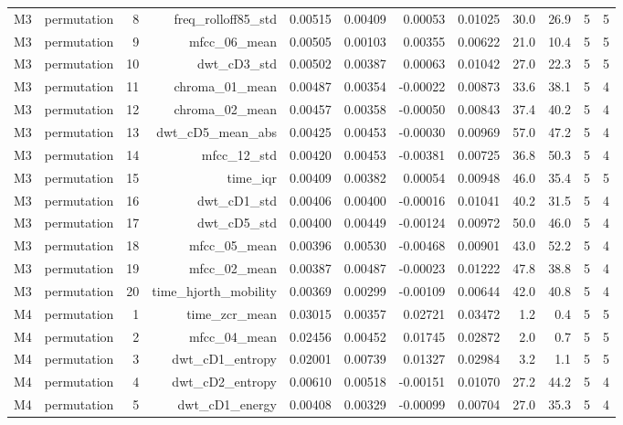 \begin{table}[htbp]
\begin{tabular}{lrrrrrrrrrrr}
    M3 & permutation & 8 & freq\_rolloff85\_std & 0.00515 & 0.00409 & 0.00053 & 0.01025 & 30.0 & 26.9 & 5 & 5 \\
    M3 & permutation & 9 & mfcc\_06\_mean & 0.00505 & 0.00103 & 0.00355 & 0.00622 & 21.0 & 10.4 & 5 & 5 \\
    M3 & permutation & 10 & dwt\_cD3\_std & 0.00502 & 0.00387 & 0.00063 & 0.01042 & 27.0 & 22.3 & 5 & 5 \\
    M3 & permutation & 11 & chroma\_01\_mean & 0.00487 & 0.00354 & -0.00022 & 0.00873 & 33.6 & 38.1 & 5 & 4 \\
    M3 & permutation & 12 & chroma\_02\_mean & 0.00457 & 0.00358 & -0.00050 & 0.00843 & 37.4 & 40.2 & 5 & 4 \\
    M3 & permutation & 13 & dwt\_cD5\_mean\_abs & 0.00425 & 0.00453 & -0.00030 & 0.00969 & 57.0 & 47.2 & 5 & 4 \\
    M3 & permutation & 14 & mfcc\_12\_std & 0.00420 & 0.00453 & -0.00381 & 0.00725 & 36.8 & 50.3 & 5 & 4 \\
    M3 & permutation & 15 & time\_iqr & 0.00409 & 0.00382 & 0.00054 & 0.00948 & 46.0 & 35.4 & 5 & 5 \\
    M3 & permutation & 16 & dwt\_cD1\_std & 0.00406 & 0.00400 & -0.00016 & 0.01041 & 40.2 & 31.5 & 5 & 4 \\
    M3 & permutation & 17 & dwt\_cD5\_std & 0.00400 & 0.00449 & -0.00124 & 0.00972 & 50.0 & 46.0 & 5 & 4 \\
    M3 & permutation & 18 & mfcc\_05\_mean & 0.00396 & 0.00530 & -0.00468 & 0.00901 & 43.0 & 52.2 & 5 & 4 \\
    M3 & permutation & 19 & mfcc\_02\_mean & 0.00387 & 0.00487 & -0.00023 & 0.01222 & 47.8 & 38.8 & 5 & 4 \\
    M3 & permutation & 20 & time\_hjorth\_mobility & 0.00369 & 0.00299 & -0.00109 & 0.00644 & 42.0 & 40.8 & 5 & 4 \\
    M4 & permutation & 1 & time\_zcr\_mean & 0.03015 & 0.00357 & 0.02721 & 0.03472 & 1.2 & 0.4 & 5 & 5 \\
    M4 & permutation & 2 & mfcc\_04\_mean & 0.02456 & 0.00452 & 0.01745 & 0.02872 & 2.0 & 0.7 & 5 & 5 \\
    M4 & permutation & 3 & dwt\_cD1\_entropy & 0.02001 & 0.00739 & 0.01327 & 0.02984 & 3.2 & 1.1 & 5 & 5 \\
    M4 & permutation & 4 & dwt\_cD2\_entropy & 0.00610 & 0.00518 & -0.00151 & 0.01070 & 27.2 & 44.2 & 5 & 4 \\
    M4 & permutation & 5 & dwt\_cD1\_energy & 0.00408 & 0.00329 & -0.00099 & 0.00704 & 27.0 & 35.3 & 5 & 4 \\

\end{tabular}
\end{table}
